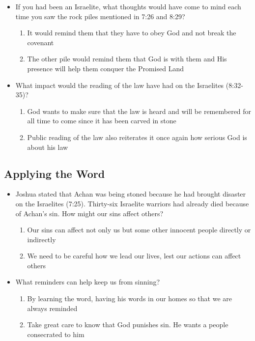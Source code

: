 \documentclass[11pt]{article}
\begin{document}
\begin{itemize}
\item If you had been an Israelite, what thoughts would have come to mind
each time you saw the rock piles mentioned in 7:26 and 8:29?
\begin{enumerate}
\item It would remind them that they have to obey God and not break the
covenant

\item The other pile would remind them that God is with them and His
presence will help them conquer the Promised Land
\end{enumerate}

\item What impact would the reading of the law have had on the Israelites
(8:32-35)?
\begin{enumerate}
\item God wants to make sure that the law is heard and will be
remembered for all time to come since it has been carved in stone

\item Public reading of the law also reiterates it once again how
serious God is about his law
\end{enumerate}
\end{itemize}

\subsection{Applying the Word}
\label{sec:org34782f1}

\begin{itemize}
\item Joshua stated that Achan was being stoned because he had brought
disaster on the Israelites (7:25). Thirty-six Israelite warriors had
already died because of Achan's sin. How might our sins affect
others?
\begin{enumerate}
\item Our sins can affect not only us but some other innocent people
directly or indirectly
\item We need to be careful how we lead our lives, lest our actions can
affect others
\end{enumerate}

\item What reminders can help keep us from sinning?
\begin{enumerate}
\item By learning the word, having his words in our homes so that we
are always reminded

\item Take great care to know that God punishes sin. He wants a people
consecrated to him
\end{enumerate}
\end{itemize}
\end{document}

